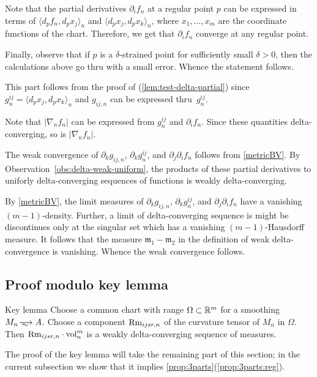 Note that the partial derivatives $\partial_if_n$ at a regular point $p$ can be expressed in terms of $\langle d_pf_n,d_px_j\rangle_n$ and $\langle d_px_j,d_px_k\rangle_n$, where $x_1,\dots,x_m$ are the coordinate functions of the chart.
Therefore, we get that $\partial_if_n$ converge at any regular point.

Finally, observe that if $p$ is a $\delta$-strained point for sufficiently small $\delta>0$,
then the calculations above go thru with a small error.
Whence the statement follows.

 This part follows from the proof of (\ref{lem:test-delta-partial}) since $g^{ij}_n=\langle d_px_j,d_px_k\rangle_n$ and $g_{ij,n}$ can be expressed thru~$g^{ij}_n$.

Note that $|\nabla_n f_n|$ can be expressed from $g^{ij}_n$ and $\partial_if_n$.
Since these quantities delta-converging, so is $|\nabla_n f_n|$.

 The weak convergence of $\partial_kg_{ij,n}$, $\partial_k g^{ij}_n$, and $\partial_j\partial_if_n$
follows from \ref{metricBV}.
By Observation~\ref{obs:delta-weak-uniform}, the products of these partial derivatives to uniforly delta-converging sequences of functions is weakly delta-converging.

By \ref{metricBV}, the limit measures of $\partial_kg_{ij,n}$, $\partial_k g^{ij}_n$, and $\partial_j\partial_if_n$ have a vanishing $(m-1)$-density.
Further, a limit of delta-converging sequence is might be discontinues only at the singular set which has a vanishing $(m-1)$-Hausdorff measure.
It follows that the measure $\mathfrak{m}_1-\mathfrak{m}_2$ in the definition of weak delta-convergence is vanishing. 
Whence the weak convergence follows.
\qeds

\subsection{Proof modulo key lemma}

\begin{thm}{Key lemma}\label{A^0}
Choose a common chart with range $\Omega\subset \mathbb{R}^m$ for a smoothing $M_n\smooths{} A$.
Choose a component $\operatorname{\rm Rm}_{ijsr,n}$ of the curvature tensor of $M_n$ in $\Omega$.
Then $\Rm_{ijsr,n}\cdot \vol^m_n$ is a weakly delta-converging sequence of measures.
\end{thm}

The proof of the key lemma will take the remaining part of this section;
in the current subsection we show that it implies \ref{prop:3parts}(\ref{prop:3parts:reg}).


